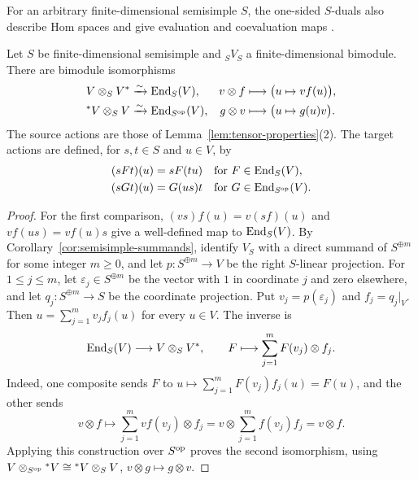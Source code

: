 \begin{advanced}
For an arbitrary finite-dimensional semisimple $S$, the one-sided $S$-duals also describe Hom spaces and give evaluation and coevaluation maps \cite[\S2.7]{BGS96}.

\begin{lemma}\label{lem:endomorphism-duals}
Let $S$ be finite-dimensional semisimple and ${}_SV_S$ a finite-dimensional bimodule.
There are bimodule isomorphisms
\begin{equation}\label{eq:hom-from-S-duals}
\begin{aligned}
V\otimes_S V^*&\xrightarrow{\sim}\operatorname{End}\nolimits_S(V),
& v\otimes f&\longmapsto\bigl(u\mapsto vf(u)\bigr),\\
{}^*V\otimes_S V&\xrightarrow{\sim}\operatorname{End}\nolimits_{S^{\mathrm{op}}}(V),
& g\otimes v&\longmapsto\bigl(u\mapsto g(u)v\bigr).
\end{aligned}
\end{equation}
The source actions are those of Lemma~\ref{lem:tensor-properties}(2).
The target actions are defined, for $s,t\in S$ and $u\in V$, by
\begin{equation}\label{eq:endomorphism-actions}
\begin{aligned}
(sFt)(u)&=sF(tu)&&\text{for }F\in\operatorname{End}\nolimits_S(V),\\
(sGt)(u)&=G(us)t&&\text{for }G\in\operatorname{End}\nolimits_{S^{\mathrm{op}}}(V).
\end{aligned}
\end{equation}
\end{lemma}

\begin{proof}
For the first comparison, $(vs)f(u)=v(sf)(u)$ and $vf(us)=vf(u)s$ give a well-defined map to $\operatorname{End}\nolimits_S(V)$.
By Corollary~\ref{cor:semisimple-summands}, identify $V_S$ with a direct summand of $S^{\oplus m}$ for some integer $m\geq0$, and let $p:S^{\oplus m}\to V$ be the right $S$-linear projection.
For $1\leq j\leq m$, let $\varepsilon_j\in S^{\oplus m}$ be the vector with $1$ in coordinate $j$ and zero elsewhere, and let $q_j:S^{\oplus m}\to S$ be the coordinate projection.
Put $v_j=p(\varepsilon_j)$ and $f_j=q_j|_V$.
Then $u=\sum_{j=1}^m v_jf_j(u)$ for every $u\in V$.
The inverse is
\[
\operatorname{End}\nolimits_S(V)\longrightarrow V\otimes_S V^*,
\qquad F\longmapsto\sum_{j=1}^m F(v_j)\otimes f_j.
\]
Indeed, one composite sends $F$ to $u\mapsto\sum_{j=1}^mF(v_j)f_j(u)=F(u)$, and the other sends
\[
v\otimes f\longmapsto\sum_{j=1}^m vf(v_j)\otimes f_j
=v\otimes\sum_{j=1}^m f(v_j)f_j=v\otimes f.
\]
Applying this construction over $S^{\mathrm{op}}$ proves the second isomorphism, using
$V\otimes_{S^{\mathrm{op}}}{}^*V\cong{}^*V\otimes_S V$, $v\otimes g\mapsto g\otimes v$.


\end{proof}
\end{advanced}
